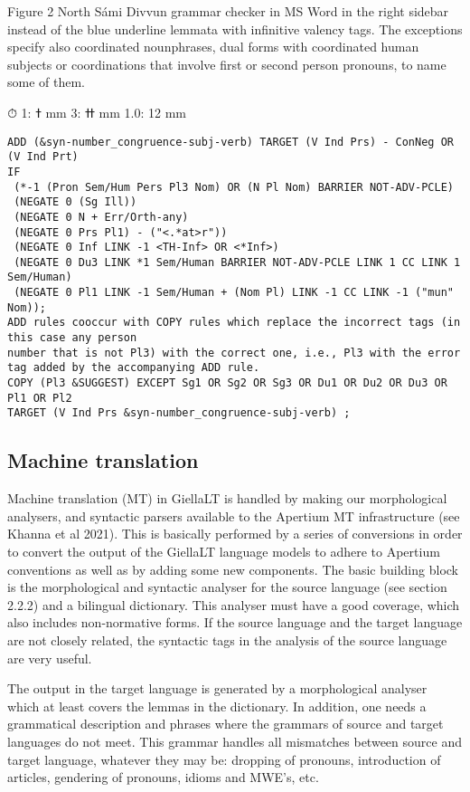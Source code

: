 \documentclass[free]{flammie}
\begin{document}
Figure 2 North Sámi Divvun grammar checker in MS Word in the right sidebar
instead of the blue underline
lemmata with infinitive valency tags. The exceptions specify also coordinated nounphrases, dual forms with coordinated human subjects or coordinations that involve first or
second person pronouns, to name some of them.

⏱
ߙ :1 mm
ߚ :3 mm
1.0: 12 mm

\begin{verbatim}
ADD (&syn-number_congruence-subj-verb) TARGET (V Ind Prs) - ConNeg OR (V Ind Prt)
IF
 (*-1 (Pron Sem/Hum Pers Pl3 Nom) OR (N Pl Nom) BARRIER NOT-ADV-PCLE)
 (NEGATE 0 (Sg Ill))
 (NEGATE 0 N + Err/Orth-any)
 (NEGATE 0 Prs Pl1) - ("<.*at>r"))
 (NEGATE 0 Inf LINK -1 <TH-Inf> OR <*Inf>)
 (NEGATE 0 Du3 LINK *1 Sem/Human BARRIER NOT-ADV-PCLE LINK 1 CC LINK 1 Sem/Human)
 (NEGATE 0 Pl1 LINK -1 Sem/Human + (Nom Pl) LINK -1 CC LINK -1 ("mun" Nom));
ADD rules cooccur with COPY rules which replace the incorrect tags (in this case any person
number that is not Pl3) with the correct one, i.e., Pl3 with the error tag added by the accompanying ADD rule.
COPY (Pl3 &SUGGEST) EXCEPT Sg1 OR Sg2 OR Sg3 OR Du1 OR Du2 OR Du3 OR Pl1 OR Pl2
TARGET (V Ind Prs &syn-number_congruence-subj-verb) ;
\end{verbatim}

\subsection{Machine translation}

Machine translation (MT) in GiellaLT is handled by making our morphological analysers,
and syntactic parsers available to the Apertium MT infrastructure (see Khanna et al 2021).
This is basically performed by a series of conversions in order to convert the output of the
GiellaLT language models to adhere to Apertium conventions as well as by adding some
new components. The basic building block is the morphological and syntactic analyser for
the source language (see section 2.2.2) and a bilingual dictionary. This analyser must have
a good coverage, which also includes non-normative forms. If the source language and the
target language are not closely related, the syntactic tags in the analysis of the source language are very useful.

The output in the target language is generated by a morphological analyser which at
least covers the lemmas in the dictionary. In addition, one needs a grammatical description
and phrases where the grammars of source and target languages do not meet. This grammar
handles all mismatches between source and target language, whatever they may be: dropping of pronouns, introduction of articles, gendering of pronouns, idioms and MWE’s, etc.
\end{document}
